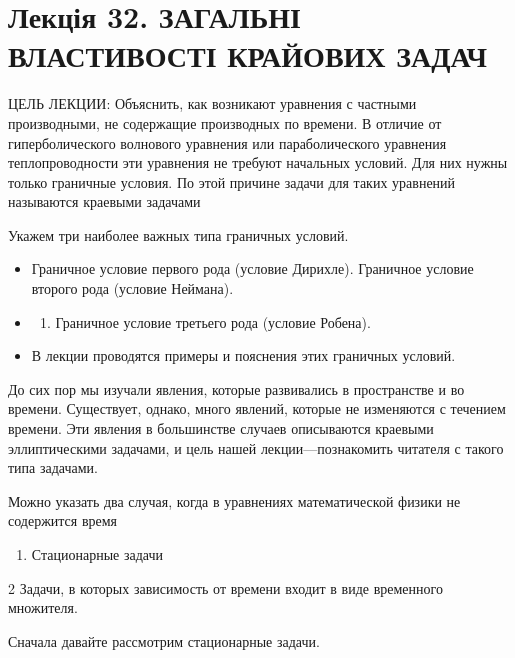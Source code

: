 \documentclass[
  ukrainian,
]{article}
\providecommand{\tightlist}{%
  \setlength{\itemsep}{0pt}\setlength{\parskip}{0pt}}
\begin{document}
\section{Лекція 32. ЗАГАЛЬНІ ВЛАСТИВОСТІ КРАЙОВИХ
ЗАДАЧ}\label{ux43bux435ux43aux446ux456ux44f-32.-ux437ux430ux433ux430ux43bux44cux43dux456-ux432ux43bux430ux441ux442ux438ux432ux43eux441ux442ux456-ux43aux440ux430ux439ux43eux432ux438ux445-ux437ux430ux434ux430ux447}

ЦЕЛЬ ЛЕКЦИИ: Объяснить, как возникают уравнения с частными производными,
не содержащие производных по времени. В отличие от гиперболического
волнового уравнения или параболического уравнения теплопроводности эти
уравнения не требуют начальных условий. Для них нужны только граничные
условия. По этой причине задачи для таких уравнений называются краевыми
задачами

Укажем три наиболее важных типа граничных условий.

\begin{itemize}
\tightlist
\item
  Граничное условие первого рода (условие Дирихле). Граничное условие
  второго рода (условие Неймана).
\item
  \begin{enumerate}
  \def\labelenumi{\arabic{enumi}.}
  \setcounter{enumi}{2}
  \tightlist
  \item
    Граничное условие третьего рода (условие Робена).
  \end{enumerate}
\item
  В лекции проводятся примеры и пояснения этих граничных условий.
\end{itemize}

До сих пор мы изучали явления, которые развивались в пространстве и во
времени. Существует, однако, много явлений, которые не изменяются с
течением времени. Эти явления в большинстве случаев описываются краевыми
эллиптическими задачами, и цель нашей лекции---познакомить читателя с
такого типа задачами.

Можно указать два случая, когда в уравнениях математической физики не
содержится время

\begin{enumerate}
\def\labelenumi{\arabic{enumi}.}
\tightlist
\item
  Стационарные задачи
\end{enumerate}

2 Задачи, в которых зависимость от времени входит в виде временного
множителя.

Сначала давайте рассмотрим стационарные задачи.
\end{document}
